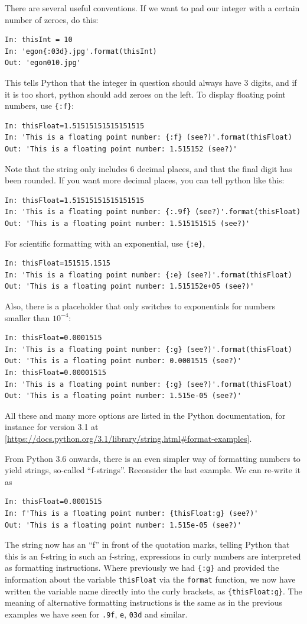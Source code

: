 \documentclass[twocolumn,apj]{openjournal}
\begin{document}
There are several useful conventions. If we want to pad our integer with a certain number of zeroes, do this:
\begin{lstlisting}
In: thisInt = 10
In: 'egon{:03d}.jpg'.format(thisInt)
Out: 'egon010.jpg'
\end{lstlisting}
This tells Python that the integer in question should always have 3 digits, and if it is too short, python should add zeroes on the left. To display floating point numbers, use \verb|{:f}|:
\begin{lstlisting}
In: thisFloat=1.51515151515151515
In: 'This is a floating point number: {:f} (see?)'.format(thisFloat)
Out: 'This is a floating point number: 1.515152 (see?)' 
\end{lstlisting}
Note that the string only includes 6 decimal places, and that the final digit has been rounded. If you want more decimal places, you can tell python like this:
\begin{lstlisting}
In: thisFloat=1.51515151515151515
In: 'This is a floating point number: {:.9f} (see?)'.format(thisFloat) 
Out: 'This is a floating point number: 1.515151515 (see?)'
\end{lstlisting}
For scientific formatting with an exponential, use \verb|{:e}|,
\begin{lstlisting}
In: thisFloat=151515.1515
In: 'This is a floating point number: {:e} (see?)'.format(thisFloat) 
Out: 'This is a floating point number: 1.515152e+05 (see?)'
\end{lstlisting}
Also, there is a placeholder  that only switches to exponentials for numbers smaller than $10^{-4}$:
\begin{lstlisting}
In: thisFloat=0.0001515
In: 'This is a floating point number: {:g} (see?)'.format(thisFloat)
Out: 'This is a floating point number: 0.0001515 (see?)'
In: thisFloat=0.00001515
In: 'This is a floating point number: {:g} (see?)'.format(thisFloat)
Out: 'This is a floating point number: 1.515e-05 (see?)'
\end{lstlisting}
All these and many more options are listed in the Python documentation, for instance for version 3.1 at [\href{https://docs.python.org/3.1/library/string.html#format-examples}{https://docs.python.org/3.1/library/string.html\#format-examples}].

From Python 3.6 onwards, there is an even simpler way of formatting numbers to yield strings, so-called ``f-strings''. Reconsider the last example. We can re-write it as
\begin{lstlisting}
In: thisFloat=0.0001515
In: f'This is a floating point number: {thisFloat:g} (see?)'
Out: 'This is a floating point number: 1.515e-05 (see?)'
\end{lstlisting}
The string now has an ``f'' in front of the quotation marks, telling Python that this is an f-string in such an f-string, expressions in curly numbers are interpreted as formatting instructions. Where previously we had \verb|{:g}| and provided the information about the variable \verb|thisFloat| via the \verb|format| function, we now have written the variable name directly into the curly brackets, as \verb|{thisFloat:g}|. The meaning of alternative formatting instructions is the same as in the previous examples we have seen for \verb|.9f|, \verb|e|, \verb|03d| and similar. 
\end{document}
